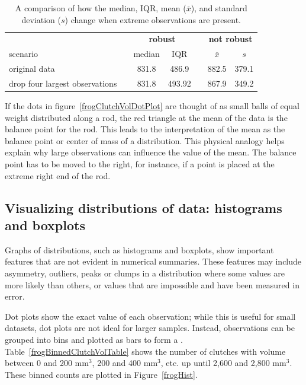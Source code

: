 \begin{doublespace}
\begin{table}[ht]
	\centering
	\begin{tabular}{l c cc c cc}
		\hline
		& \hspace{0mm} & \multicolumn{2}{c}{\bf robust} & \hspace{2mm} & \multicolumn{2}{c}{\bf not robust} \\
		scenario && median & IQR && $\overline{x}$ & $s$ \\ 
		\hline
		original \var{frog} data 	&& 831.8 & 486.9 && 882.5 & 379.1 \\
		drop four largest observations && 831.8 & 493.92 && 867.9 & 349.2 \\
		\hline
	\end{tabular}
	\caption{A comparison of how the median, IQR, mean ($\overline{x}$), and standard deviation ($s$) change when extreme observations are present.}
	\label{frogRobustOrNotTable}
\end{table}

If the dots in figure~\ref{frogClutchVolDotPlot} are thought of as small balls of equal weight distributed along a rod, the red triangle at the mean of the data is the balance point for the rod. This leads to the interpretation of the mean as the balance point or center of mass of a distribution. This physical analogy helps explain why large observations can influence the value of the mean.  The balance point has to be moved to the right, for instance, if a point is placed at the extreme right end of the rod.


\subsection{Visualizing distributions of data: histograms and boxplots}
\label{histogramsBoxplots}

Graphs of distributions, such as histograms and boxplots, show important features that are not evident in numerical summaries.  These features may include asymmetry, outliers, peaks or clumps in a distribution where some values are more likely than others, or values that are impossible and have been measured in error.

Dot plots show the exact value of each observation; while this is useful for small datasets, dot plots are not ideal for larger samples. Instead, observations can be grouped into bins and plotted as bars to form a . Table~\ref{frogBinnedClutchVolTable} shows the number of clutches with volume between 0 and 200 $\textrm{mm}^{3}$, 200 and 400 $\textrm{mm}^{3}$, etc. up until 2,600 and 2,800 $\textrm{mm}^{3}$. These binned counts are plotted in Figure~\ref{frogHist}.


\end{doublespace}
